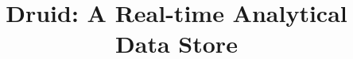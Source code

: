 \documentclass{vldb}
\begin{document}

\title{Druid: A Real-time Analytical Data Store}



%
%
%
%

\end{document}
